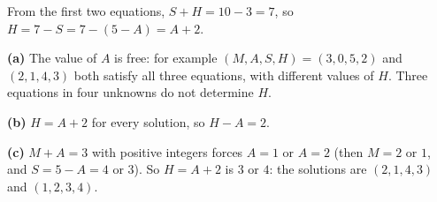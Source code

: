 From the first two equations, $S+H=10-3=7$, so $H=7-S=7-(5-A)=A+2$.

\textbf{(a)} The value of $A$ is free: for example $(M,A,S,H)=(3,0,5,2)$ and $(2,1,4,3)$ both satisfy all three equations, with different values of $H$. Three equations in four unknowns do not determine $H$.

\textbf{(b)} $H=A+2$ for every solution, so $H-A=\boxed{2}$.

\textbf{(c)} $M+A=3$ with positive integers forces $A=1$ or $A=2$ (then $M=2$ or $1$, and $S=5-A=4$ or $3$). So $H=A+2$ is $\boxed{3\text{ or }4}$: the solutions are $(2,1,4,3)$ and $(1,2,3,4)$.
